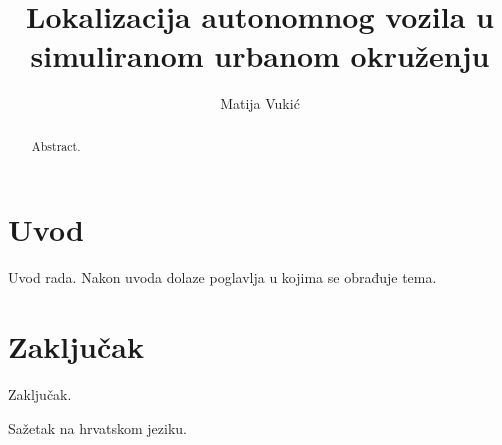 \documentclass[times, utf8, diplomski]{fer}
\begin{document}

\title{Lokalizacija autonomnog vozila u simuliranom urbanom okruženju}

\author{Matija Vukić}

\maketitle

\izvornik


\tableofcontents

\chapter{Uvod}
Uvod rada. Nakon uvoda dolaze poglavlja u kojima se obrađuje tema.

\chapter{Zaključak}
Zaključak.




\begin{sazetak}
Sažetak na hrvatskom jeziku.

\end{sazetak}

\begin{abstract}
Abstract.

\end{abstract}
\end{document}
